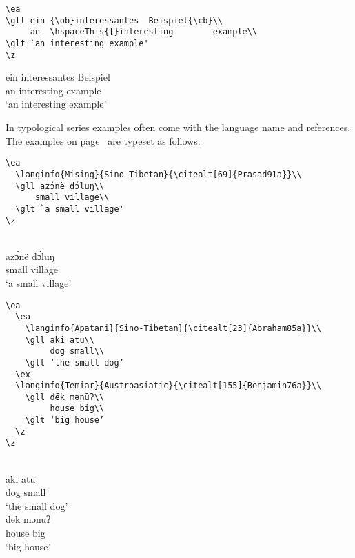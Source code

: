 \begin{verbatim}
\ea
\gll ein {\ob}interessantes  Beispiel{\cb}\\
     an  \hspaceThis{[}interesting        example\\
\glt `an interesting example'
\z 
\end{verbatim}

\ea
\def\exfont{\normalsize\it}
\gll ein {\ob}interessantes       Beispiel{\cb}\\
     an  \hspaceThis{[}interesting example\\
\glt `an interesting example'
\z 
 


In typological series examples often come with the language name and references. The examples on
page~\pageref{ex-typology} are typeset as follows:
\begin{verbatim}
\ea
  \langinfo{Mising}{Sino-Tibetan}{\citealt[69]{Prasad91a}}\\
  \gll azɔ́në dɔ́luŋ\\
      small village\\ 
  \glt `a small village' 
\z
\end{verbatim}
\ea
  \\
  \gll azɔ́në dɔ́luŋ\\
      small village\\ 
  \glt `a small village' 
\z

\begin{verbatim}
\ea 
  \ea
    \langinfo{Apatani}{Sino-Tibetan}{\citealt[23]{Abraham85a}}\\
    \gll aki atu\\ 
         dog small\\ 
    \glt ‘the small dog’ 
  \ex
  \langinfo{Temiar}{Austroasiatic}{\citealt[155]{Benjamin76a}}\\ 
    \gll dēk mənūʔ\\
         house big\\
    \glt ‘big house’ 
  \z
\z
\end{verbatim}

\ea 
  \ea
    \\
    \gll aki atu\\ 
	dog small\\ 
    \glt ‘the small dog’ 
  \ex
  \\ 
    \gll dēk mənūʔ\\
	house big\\
    \glt ‘big house’ 
  \z
\z

